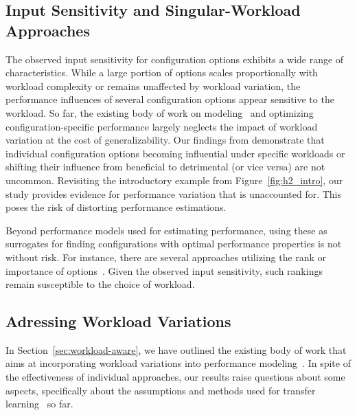 {{\subsection{Input Sensitivity and Singular-Workload Approaches}
The observed input sensitivity for configuration options exhibits a wide range of characteristics. While a large portion of options scales proportionally with workload complexity or remains unaffected by workload variation, the performance influences of several configuration options appear sensitive to the workload.  So far, the existing body of work on modeling~\cite{dorn2020,siegmundPerformanceinfluenceModelsHighly2015,haDeepPerf2019,perfAL,guoVariabilityawarePerformancePrediction2013,sarkarCostEfficientSamplingPerformance,guo_2018_data,fourier_learning_2015,perLasso} and optimizing~\cite{chen_mmo_2021,nairUsingBadLearners2017,nairFlash18,ohFindingNearoptimalConfigurations2017} configuration-specific performance largely neglects the impact of workload variation at the cost of generalizability. 
Our findings from  demonstrate that individual configuration options becoming influential under specific workloads or shifting their influence from beneficial to detrimental (or vice versa) are not uncommon. Revisiting the introductory example from Figure~\ref{fig:h2_intro}, our study provides evidence for performance variation that is unaccounted for. This poses the risk of distorting performance estimations.

Beyond performance models used for estimating performance, using these as surrogates for finding configurations with optimal performance properties is not without risk. For instance, there are several approaches utilizing the rank or importance of options~\cite{nairUsingBadLearners2017,ohFindingNearoptimalConfigurations2017}. Given the observed input sensitivity, such rankings remain susceptible to the choice of workload.



\subsection{Adressing Workload Variations}
In Section~\ref{sec:workload-aware}, we have outlined the existing body of work that aims at incorporating workload variations into performance modeling~\cite{koc_satune_2021,jamishidi_transfer_2017,jamshidi_learning_2018,jamshidi_transfer_gp_2017}. In spite of the effectiveness of individual approaches, our results raise questions about some aspects, specifically about the assumptions and methods used for transfer learning~\cite{jamshidi_learning_2018,jamishidi_transfer_2017} so far. 

}}
